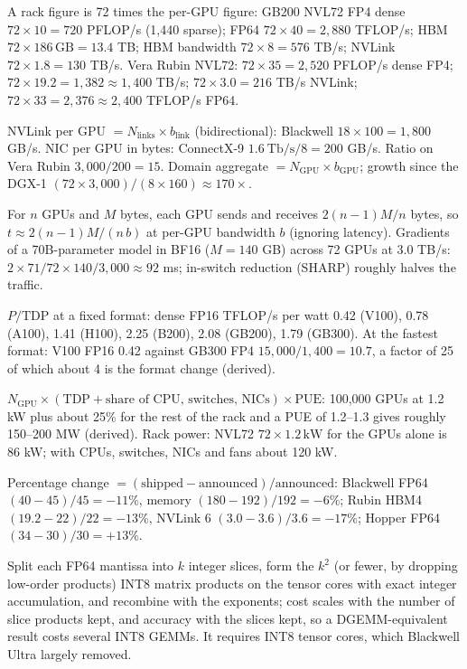 \documentclass[11pt,letterpaper]{article}
\begin{document}
\begin{description}[leftmargin=0pt,labelindent=0pt,itemsep=6pt,font=\normalfont\bfseries\sffamily]
\item[Rack totals.] A rack figure is 72 times the per-GPU figure: GB200 NVL72 FP4 dense $72\times 10 = 720$ PFLOP/s (1{,}440 sparse); FP64 $72\times 40 = 2{,}880$ TFLOP/s; HBM $72\times 186\,\mathrm{GB} = 13.4$ TB; HBM bandwidth $72\times 8 = 576$ TB/s; NVLink $72\times 1.8 = 130$ TB/s. Vera Rubin NVL72: $72\times 35 = 2{,}520$ PFLOP/s dense FP4; $72\times 19.2 = 1{,}382 \approx 1{,}400$ TB/s; $72\times 3.0 = 216$ TB/s NVLink; $72\times 33 = 2{,}376 \approx 2{,}400$ TFLOP/s FP64.
\item[Scale-up against scale-out.] NVLink per GPU $= N_{\text{links}}\times b_{\text{link}}$ (bidirectional): Blackwell $18\times 100 = 1{,}800$ GB/s. NIC per GPU in bytes: ConnectX-9 $1.6\ \mathrm{Tb/s}/8 = 200$ GB/s. Ratio on Vera Rubin $3{,}000/200 = 15$. Domain aggregate $= N_{\text{GPU}}\times b_{\text{GPU}}$; growth since the DGX-1 $(72\times 3{,}000)/(8\times 160) \approx 170\times$.
\item[Ring all-reduce.] For $n$ GPUs and $M$ bytes, each GPU sends and receives $2(n-1)M/n$ bytes, so $t \approx 2(n-1)M/(n\,b)$ at per-GPU bandwidth $b$ (ignoring latency). Gradients of a 70B-parameter model in BF16 ($M = 140$ GB) across 72 GPUs at 3.0 TB/s: $2\times 71/72\times 140/3{,}000 \approx 92$ ms; in-switch reduction (SHARP) roughly halves the traffic.
\item[Performance per watt.] $P/\text{TDP}$ at a fixed format: dense FP16 TFLOP/s per watt 0.42 (V100), 0.78 (A100), 1.41 (H100), 2.25 (B200), 2.08 (GB200), 1.79 (GB300). At the fastest format: V100 FP16 0.42 against GB300 FP4 $15{,}000/1{,}400 = 10.7$, a factor of 25 of which about 4 is the format change (derived).
\item[Cluster power.] $N_{\text{GPU}}\times(\text{TDP} + \text{share of CPU, switches, NICs})\times\text{PUE}$: 100{,}000 GPUs at 1.2 kW plus about 25\% for the rest of the rack and a PUE of 1.2--1.3 gives roughly 150--200 MW (derived). Rack power: NVL72 $72\times 1.2\,\mathrm{kW}$ for the GPUs alone is 86 kW; with CPUs, switches, NICs and fans about 120 kW.
\item[Announced versus shipped.] Percentage change $= (\text{shipped} - \text{announced})/\text{announced}$: Blackwell FP64 $(40 - 45)/45 = -11\%$, memory $(180 - 192)/192 = -6\%$; Rubin HBM4 $(19.2 - 22)/22 = -13\%$, NVLink 6 $(3.0 - 3.6)/3.6 = -17\%$; Hopper FP64 $(34 - 30)/30 = +13\%$.
\item[Emulated FP64 (Ozaki scheme).] Split each FP64 mantissa into $k$ integer slices, form the $k^2$ (or fewer, by dropping low-order products) INT8 matrix products on the tensor cores with exact integer accumulation, and recombine with the exponents; cost scales with the number of slice products kept, and accuracy with the slices kept, so a DGEMM-equivalent result costs several INT8 GEMMs. It requires INT8 tensor cores, which Blackwell Ultra largely removed.
\end{description}
\end{document}
